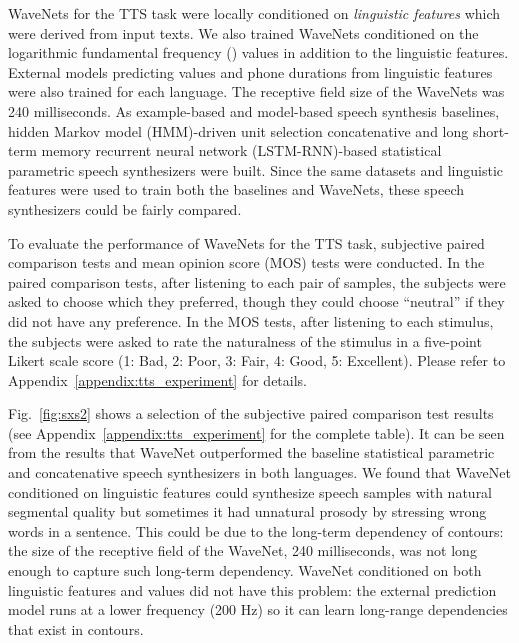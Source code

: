 \documentclass{article}
\newcommand{\figref}[1]{Fig.~\ref{#1}}
\begin{document}
WaveNets for the TTS task were locally conditioned on \emph{linguistic features} which were derived from input texts.
We also trained WaveNets conditioned on the logarithmic fundamental frequency () values in addition to the linguistic features.
External models predicting  values and phone durations from linguistic features were also trained for each language.
The receptive field size of the WaveNets was 240 milliseconds.
As example-based and model-based speech synthesis baselines, hidden Markov model (HMM)-driven unit selection concatenative \citep{Xavi_Barracuda_interspeech}
and long short-term memory recurrent neural network (LSTM-RNN)-based statistical parametric \citep{Zen_LSTMprod_Interspeech} speech synthesizers were built.
Since the same datasets and linguistic features were used to train both the baselines and WaveNets, these speech synthesizers could be fairly compared.

To evaluate the performance of WaveNets for the TTS task, subjective paired comparison tests and mean opinion score (MOS) tests were conducted.
In the paired comparison tests, after listening to each pair of samples, the subjects were asked to choose which they preferred, though they could choose ``neutral'' if they did not have any preference.
In the MOS tests, after listening to each stimulus, the subjects were asked to rate the naturalness of the stimulus in a five-point Likert scale score (1: Bad, 2: Poor, 3: Fair, 4: Good, 5: Excellent).
Please refer to Appendix~\ref{appendix:tts_experiment} for details.

\figref{fig:sxs2} shows a selection of the subjective paired comparison test results (see  Appendix~\ref{appendix:tts_experiment} for the complete table).
It can be seen from the results that WaveNet outperformed the baseline statistical parametric and concatenative speech synthesizers in both languages.
We found that WaveNet conditioned on linguistic features could synthesize speech samples with natural segmental quality but sometimes it had unnatural prosody by stressing wrong words in a sentence.
This could be due to the long-term dependency of  contours: the size of the receptive field of the WaveNet, 240 milliseconds, was not long enough to capture such long-term dependency.  
WaveNet conditioned on both linguistic features and  values did not have this problem: the external  prediction model runs at a lower frequency (200 Hz) so it can learn long-range dependencies that exist in  contours.
 
\end{document}

